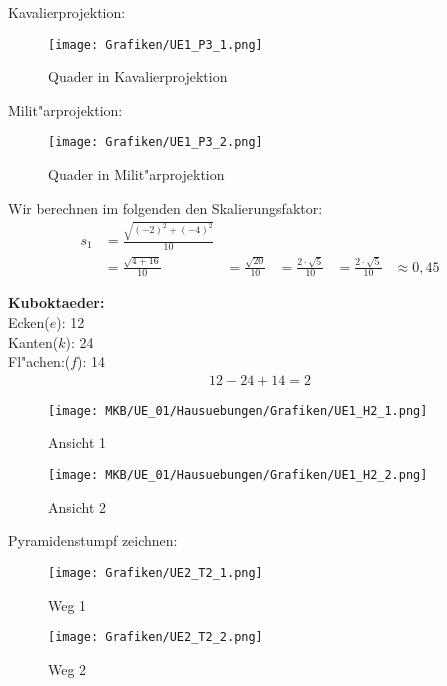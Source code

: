\begin{Loesung}
Kavalierprojektion:
\begin{figure}[H]
	\centering
	\texttt{[image: Grafiken/UE1\_P3\_1.png]}
	\caption{Quader in Kavalierprojektion}
	\label{fig:P3_1}
\end{figure}
Milit"arprojektion:
\begin{figure}[H]
	\centering
	\texttt{[image: Grafiken/UE1\_P3\_2.png]}
	\caption{Quader in Milit"arprojektion}
	\label{fig:P3_2}
\end{figure}
\end{Loesung}
\begin{Loesung}
\begin{Teilloesungen}

\item Wir berechnen im folgenden den Skalierungsfaktor:
\begin{align*}
s_1 &= \frac{\sqrt{(-2)^{2}+(-4)^{2}}}{10}\\
&= \frac{\sqrt{4+16}}{10}
&= \frac{\sqrt{20}}{10}
&= \frac{2 \cdot \sqrt{5}}{10}
&= \frac{2 \cdot \sqrt{5}}{10}
&\approx 0,45
\end{align*}

\item \textbf{Kuboktaeder:} \\
Ecken($e$): 12\\
Kanten($k$): 24\\
Fl"achen:($f$): 14\\
\abc %
\begin{align*}
12 - 24 + 14 = 2
\end{align*}

\item \begin{figure}[H]
	\centering
	\texttt{[image: MKB/UE\_01/Hausuebungen/Grafiken/UE1\_H2\_1.png]}
	\caption{Ansicht 1}
	\label{fig:H2_1}
\end{figure}

\begin{figure}[H]
	\centering
	\texttt{[image: MKB/UE\_01/Hausuebungen/Grafiken/UE1\_H2\_2.png]}
	\caption{Ansicht 2}
	\label{fig:H2_2}
\end{figure}

\end{Teilloesungen}
\end{Loesung}
%
\begin{Loesung}
\usetikzlibrary{calc}
	Pyramidenstumpf zeichnen:
	\begin{figure}[H]
		\centering
		\texttt{[image: Grafiken/UE2\_T2\_1.png]}
		\caption{Weg 1}
	\label{fig:T2_1}
	\end{figure}
	\begin{figure}[H]
		\centering
		\texttt{[image: Grafiken/UE2\_T2\_2.png]}
		\caption{Weg 2}
	\label{fig:T2_2}
	\end{figure}
\end{Loesung}
%
